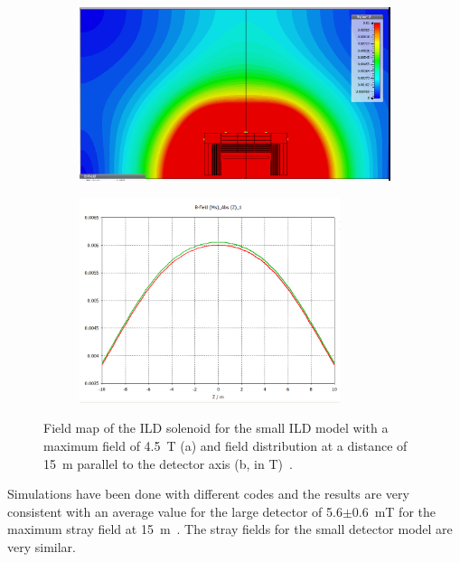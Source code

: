 \begin{figure}[h!]
\begin{center}
\begin{subfigure}{0.9\hsize} \includegraphics[width=\textwidth]{Integration/fig/strayfield_small_4_5.png}
\caption{ \label{ild:fig:magnet_small_stray_map}}
 \end{subfigure}
\hspace{0.03\textwidth}
\begin{subfigure}{0.9\hsize} \includegraphics[width=\textwidth, height =6cm]{Integration/fig/strayfield_small_4_5_plot.png}
\caption{  \label{ild:fig:magnet_small_stray_field}}
 \end{subfigure}
\end{center}
\caption{Field map of the ILD solenoid for the small ILD model with a maximum field of 4.5~T (a) and field distribution at a distance of 15~m parallel to the detector axis (b, in T)~\cite{ild:bib:Magnet_Simulations}.}
\label{ILD:fig:magnet_small_stray}
\end{figure}

Simulations have been done with different codes and the results are very consistent with an average value for the large detector of 5.6$\pm$0.6~mT for the maximum stray field at 15~m~\cite{ild:bib:Magnet_Simulations}. The stray fields for the small detector model are very similar. 

